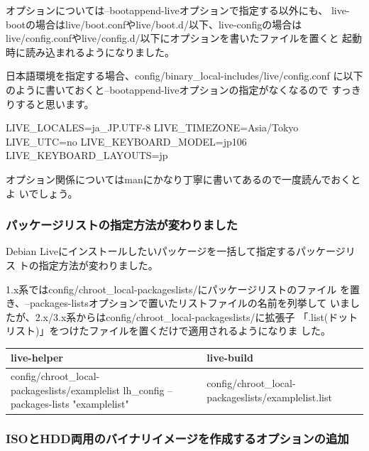 \documentclass[mingoth,a4paper]{jsarticle}
\begin{document}
オプションについては--bootappend-liveオプションで指定する以外にも、
live-bootの場合はlive/boot.confやlive/boot.d/以下、live-configの場合は
live/config.confやlive/config.d/以下にオプションを書いたファイルを置くと
起動時に読み込まれるようになりました。

日本語環境を指定する場合、config/binary\_local-includes/live/config.conf
に以下のように書いておくと--bootappend-liveオプションの指定がなくなるので
すっきりすると思います。

\begin{commandline}
 LIVE_LOCALES=ja_JP.UTF-8
 LIVE_TIMEZONE=Asia/Tokyo
 LIVE_UTC=no
 LIVE_KEYBOARD_MODEL=jp106
 LIVE_KEYBOARD_LAYOUTS=jp
\end{commandline}

オプション関係についてはmanにかなり丁寧に書いてあるので一度読んでおくとよ
いでしょう。

\subsubsection{パッケージリストの指定方法が変わりました}

Debian Liveにインストールしたいパッケージを一括して指定するパッケージリス
トの指定方法が変わりました。

1.x系ではconfig/chroot\_local-packageslists/にパッケージリストのファイル
を置き、--packages-listsオプションで置いたリストファイルの名前を列挙して
いましたが、2.x/3.x系からはconfig/chroot\_local-packageslists/に拡張子
「.list(ドットリスト)」をつけたファイルを置くだけで適用されるようになりま
した。

\begin{table}[h]
\begin{center}
 \begin{tabular}{|p{}|l|}
 \hline
 live-helper & live-build \\
 \hline
 \hline
  config/chroot\_local-packageslists/examplelist lh\_config --packages-lists "examplelist" &
  config/chroot\_local-packageslists/examplelist.list  \\
 \hline
 \end{tabular}
\end{center}
\end{table}

\subsubsection{ISOとHDD両用のバイナリイメージを作成するオプションの追加}
\end{document}
